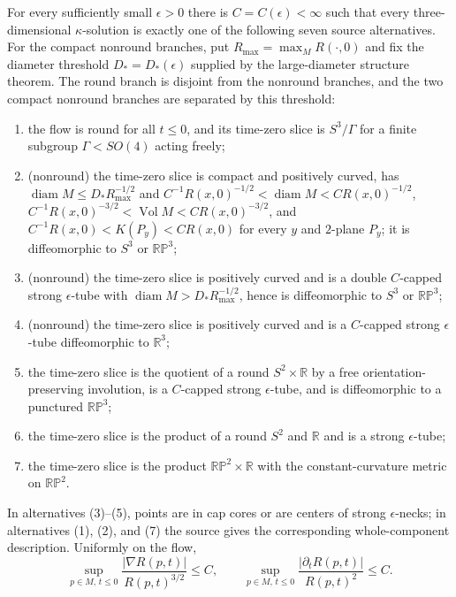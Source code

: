 \begin{theorem}
\label{thm:kappa-solution-structure-summary}
\notready
For every sufficiently small $\epsilon>0$ there is
$C=C(\epsilon)<\infty$ such that every three-dimensional
$\kappa$-solution is exactly one of the following seven source alternatives.
For the compact nonround branches, put
$R_{\max}=\max_{M}R(\cdot,0)$ and fix the diameter threshold
$D_*=D_*(\epsilon)$ supplied by the large-diameter structure theorem.  The
round branch is disjoint from the nonround branches, and the two compact
nonround branches are separated by this threshold:
\begin{enumerate}
\item the flow is round for all $t\le0$, and its time-zero slice is
      $S^3/\Gamma$ for a finite subgroup $\Gamma<SO(4)$ acting freely;
\item (nonround) the time-zero slice is compact and positively curved, has
      $\operatorname{diam}M\le D_*R_{\max}^{-1/2}$ and
      $C^{-1}R(x,0)^{-1/2}<\operatorname{diam}M<C R(x,0)^{-1/2}$,
      $C^{-1}R(x,0)^{-3/2}<\operatorname{Vol}M<C R(x,0)^{-3/2}$,
      and $C^{-1}R(x,0)<K(P_y)<C R(x,0)$ for every $y$ and $2$-plane
      $P_y$; it is diffeomorphic to $S^3$ or $\mathbb{RP}^3$;
\item (nonround) the time-zero slice is positively curved and is a double
      $C$-capped strong $\epsilon$-tube with
      $\operatorname{diam}M>D_*R_{\max}^{-1/2}$, hence is diffeomorphic to
      $S^3$ or $\mathbb{RP}^3$;
\item (nonround) the time-zero slice is positively curved and is a $C$-capped strong
      $\epsilon$-tube diffeomorphic to $\mathbb R^3$;
\item the time-zero slice is the quotient of a round $S^2\times\mathbb R$
      by a free orientation-preserving involution, is a $C$-capped strong
      $\epsilon$-tube, and is diffeomorphic to a punctured $\mathbb{RP}^3$;
\item the time-zero slice is the product of a round $S^2$ and $\mathbb R$
      and is a strong $\epsilon$-tube;
\item the time-zero slice is the product $\mathbb{RP}^2\times\mathbb R$
      with the constant-curvature metric on $\mathbb{RP}^2$.
\end{enumerate}
In alternatives (3)--(5), points are in cap cores or are centers of strong
$\epsilon$-necks; in alternatives (1), (2), and (7) the source gives the
corresponding whole-component description.  Uniformly on the flow,
\[
 \sup_{p\in M,\,t\le0}\frac{|\nabla R(p,t)|}{R(p,t)^{3/2}}\le C,
 \qquad
  \sup_{p\in M,\,t\le0}\frac{|\partial_tR(p,t)|}{R(p,t)^2}\le C.
\]
\end{theorem}

